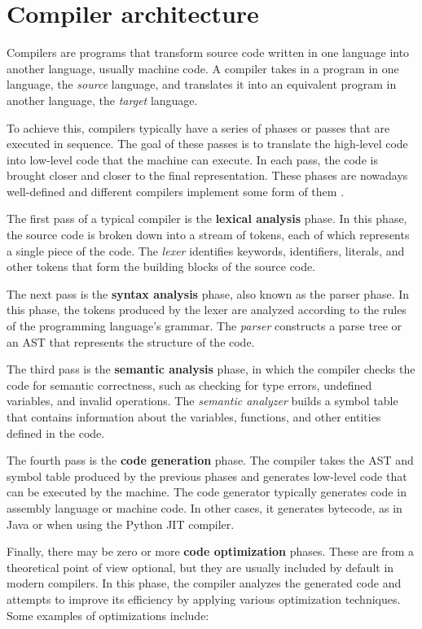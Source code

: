 \documentclass[../Thesis.tex]{subfiles}
\begin{document}
\section{Compiler architecture}
\label{sec:compiler-architecture}

Compilers are programs that transform source code
written in one language into another language, usually machine code.
A compiler takes in a program in one language, the \emph{source} language,
and translates it into an equivalent program in another language,
the \emph{target} language.

To achieve this, compilers typically have a series of phases or passes
that are executed in sequence.
The goal of these passes is to translate the high-level code
into low-level code that the machine can execute.
In each pass, the code is brought closer and closer to the final representation.
These phases are nowadays well-defined and
different compilers implement some form of them \cite[Chapter 1.2]{aho2014compilers}.

The first pass of a typical compiler is the \textbf{lexical analysis} phase.
In this phase, the source code is broken down into a stream of tokens,
each of which represents a single piece of the code.
The \emph{lexer} identifies keywords, identifiers, literals, and other tokens
that form the building blocks of the source code.

The next pass is the \textbf{syntax analysis} phase, also known as the parser phase.
In this phase, the tokens produced by the lexer are analyzed
according to the rules of the programming language's grammar.
The \emph{parser} constructs a parse tree or an \acrfull{AST}
that represents the structure of the code.

The third pass is the \textbf{semantic analysis} phase,
in which the compiler checks the code for semantic correctness,
such as checking for type errors, undefined variables, and invalid operations.
The \emph{semantic analyzer} builds a symbol table that contains information
about the variables, functions, and other entities defined in the code.

The fourth pass is the \textbf{code generation} phase.
The compiler takes the AST and symbol table produced by the previous phases
and generates low-level code that can be executed by the machine.
The code generator typically generates code in assembly language or machine code.
In other cases, it generates bytecode,
as in Java or when using the Python \acrfull{JIT} compiler.

Finally, there may be zero or more \textbf{code optimization} phases.
These are from a theoretical point of view optional,
but they are usually included by default in modern compilers.
In this phase, the compiler analyzes the generated code
and attempts to improve its efficiency by applying various optimization techniques.
Some examples of optimizations include:
\end{document}
